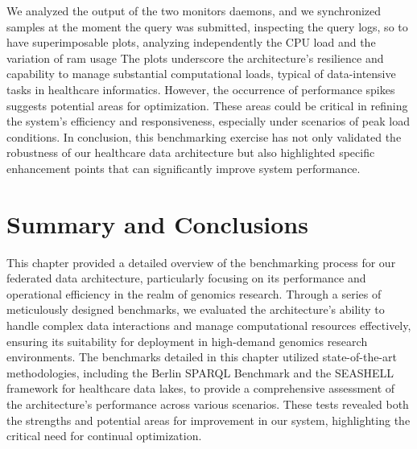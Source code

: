 We analyzed the output of the two monitors daemons, and we synchronized samples at the moment the query was submitted, inspecting the query logs, so to have superimposable plots, analyzing independently the CPU load and the variation of ram usage
The plots underscore the architecture's resilience and capability to manage substantial computational loads, typical of data-intensive tasks in healthcare informatics. However, the occurrence of performance spikes suggests potential areas for optimization. These areas could be critical in refining the system's efficiency and responsiveness, especially under scenarios of peak load conditions.
In conclusion, this benchmarking exercise has not only validated the robustness of our healthcare data architecture but also highlighted specific enhancement points that can significantly improve system performance. 

\section{Summary and Conclusions}
This chapter provided a detailed overview of the benchmarking process for our federated data architecture, particularly focusing on its performance and operational efficiency in the realm of genomics research. Through a series of meticulously designed benchmarks, we evaluated the architecture's ability to handle complex data interactions and manage computational resources effectively, ensuring its suitability for deployment in high-demand genomics research environments.
The benchmarks detailed in this chapter utilized state-of-the-art methodologies, including the Berlin SPARQL Benchmark and the SEASHELL framework for healthcare data lakes, to provide a comprehensive assessment of the architecture's performance across various scenarios. These tests revealed both the strengths and potential areas for improvement in our system, highlighting the critical need for continual optimization.